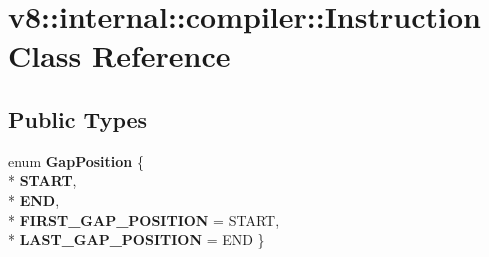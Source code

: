 \hypertarget{classv8_1_1internal_1_1compiler_1_1_instruction}{}\section{v8\+:\+:internal\+:\+:compiler\+:\+:Instruction Class Reference}
\label{classv8_1_1internal_1_1compiler_1_1_instruction}
\subsection*{Public Types}
\begin{DoxyCompactItemize}
\item 
enum {\bfseries Gap\+Position} \{ \\*
{\bfseries S\+T\+A\+RT}, 
\\*
{\bfseries E\+ND}, 
\\*
{\bfseries F\+I\+R\+S\+T\+\_\+\+G\+A\+P\+\_\+\+P\+O\+S\+I\+T\+I\+ON} = S\+T\+A\+RT, 
\\*
{\bfseries L\+A\+S\+T\+\_\+\+G\+A\+P\+\_\+\+P\+O\+S\+I\+T\+I\+ON} = E\+ND
 \}\hypertarget{classv8_1_1internal_1_1compiler_1_1_instruction_ac16ebb6b4b65e5787eebc6ddeb3ed53a}{}\label{classv8_1_1internal_1_1compiler_1_1_instruction_ac16ebb6b4b65e5787eebc6ddeb3ed53a}

\end{DoxyCompactItemize}
